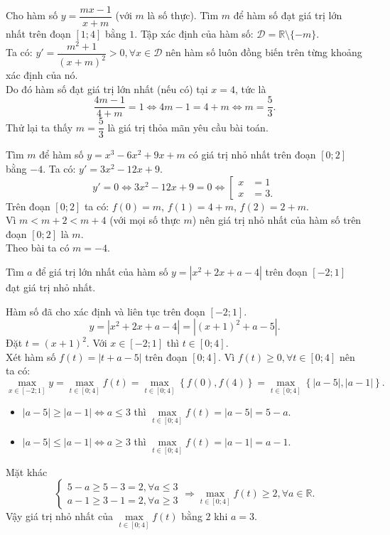 \begin{bt}%
	Cho hàm số $y=\dfrac{mx-1}{x+m}$ (với $m$ là số thực). Tìm $m$ để hàm số đạt giá trị lớn nhất trên đoạn $[1;4]$ bằng  $1$.
	\loigiai
	{
		Tập xác định của hàm số: $\mathscr{D} = \mathbb{R} \setminus\{-m\}$.\\
		Ta có: $y'=\dfrac{m^2+1}{(x+m)^2} > 0, \forall x \in \mathscr{D}$ nên hàm số luôn đồng biến trên từng khoảng xác định của nó.\\
		Do đó hàm số đạt giá trị lớn nhất (nếu có) tại $x = 4$, tức là
		$$\dfrac{4m - 1}{4 + m} = 1 \Leftrightarrow 4m - 1 = 4 + m \Leftrightarrow m = \dfrac{5}{3}.$$
		Thử lại ta thấy $m=\dfrac{5}{3}$ là giá trị thỏa mãn yêu cầu bài toán.
	}
\end{bt}


\begin{bt}%
	Tìm $m$ để hàm số $y=x^3-6x^2+9x+m$ có giá trị nhỏ nhất trên đoạn $[0;2]$ bằng $-4$.
	\loigiai
	{
		Ta có: $y' = 3x^2- 12x + 9$.
		$$y' = 0 \Leftrightarrow 3x^2 - 12x + 9 = 0 \Leftrightarrow \left[ \begin{array}{ll} x & = 1 \\ x & = 3.\end{array}	 \right.$$
		Trên đoạn $[0;2]$ ta có: $f(0)=m$, $f(1)=4+m$, $f(2)=2+m$. \\
		Vì $m < m+2 < m+4$ (với mọi số thực $m$) nên giá trị nhỏ nhất của hàm số trên đoạn $[0;2]$ là $m$.\\
		Theo bài ta có $m=-4$. 
	}
\end{bt}


\begin{bt}%
	Tìm $a$ để giá trị lớn nhất của hàm số $y = \left| x^2 + 2x + a - 4 \right|$ trên đoạn $[-2;1]$ đạt giá trị nhỏ nhất.
	\loigiai
	{
		Hàm số đã cho xác định và liên tục trên đoạn $[-2;1]$.
		$$y = \left| x^2 + 2x + a - 4 \right| = \left| (x+1)^2 + a - 5 \right|.$$
		Đặt $t = (x+1)^2$. Với $x \in [-2;1]$ thì $t \in [0;4]$.\\
		Xét hàm số $f(t) = |t + a - 5|$ trên đoạn $[0;4]$.
		Vì $f(t) \geq 0, \forall t \in [0;4]$ nên ta có:
		$$\max\limits_{x \in [-2;1]} y = \max\limits_{t \in [0;4]} f(t) = \max\limits_{t \in [0;4]} \left\{ f(0), f(4) \right\} = \max\limits_{t \in [0;4]} \left\{ |a - 5|, |a - 1| \right\}.$$
		\begin{itemize}
			\item $|a - 5| \geq |a - 1| \Leftrightarrow a \leq 3$ thì $\max\limits_{t \in [0;4]} f(t) = |a - 5| = 5 - a.$
			\item $|a - 5| \leq |a - 1| \Leftrightarrow a \geq 3$ thì $\max\limits_{t \in [0;4]} f(t) = |a - 1| = a - 1.$
		\end{itemize}
		Mặt khác
		$$\begin{cases} 5 - a \geq 5 - 3 = 2, \forall a \leq 3 \\ a - 1 \geq 3 - 1 = 2, \forall a \geq 3 \end{cases} \Rightarrow \max\limits_{t \in [0;4]} f(t) \geq 2, \forall a \in \mathbb{R}.$$
		Vậy giá trị nhỏ nhất của $\max\limits_{t \in [0;4]} f(t)$ bằng $2$ khi $a = 3$.
	}
\end{bt}


